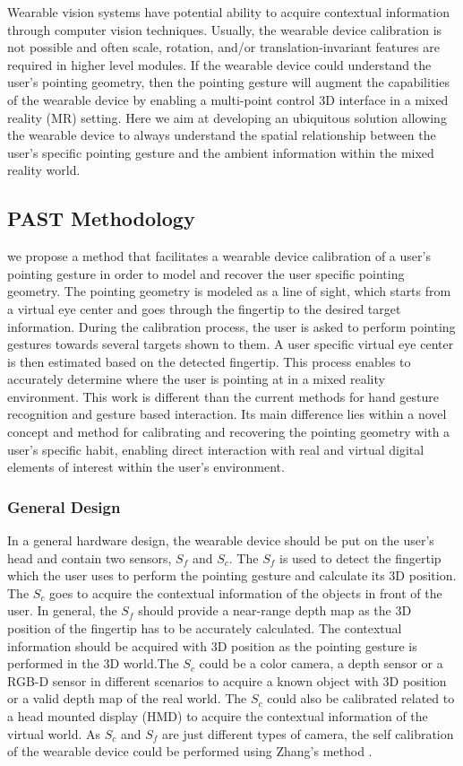 Wearable vision systems have potential ability to acquire contextual information through computer vision techniques\cite{Kurata2000}. Usually, the wearable device calibration is not possible and often scale, rotation, and/or translation-invariant features are required in higher level modules. If the wearable device could understand the user{\rq}s pointing geometry, then the pointing gesture will augment the capabilities of the wearable device by enabling a multi-point control 3D interface in a mixed reality (MR) setting. Here we aim at developing  an ubiquitous solution allowing the wearable device to always understand the spatial relationship between the user{\rq}s specific pointing gesture and the ambient information within the mixed reality world.

\subsection{PAST Methodology}
\label{sec:4-PAST:Methodology}
we propose a method that facilitates a wearable device calibration of a user's pointing gesture in order to model and recover the user specific pointing geometry. The pointing geometry is modeled as a line of sight, which starts from a virtual eye center and goes through the fingertip to the desired target information. During the calibration process, the user is asked to perform pointing gestures towards several targets shown to them. A user specific virtual eye center is then estimated based on the detected fingertip.
This process enables to accurately determine where the user is pointing at in a mixed reality environment. This work is different than the current methods for hand gesture recognition and gesture based interaction.  Its main difference lies within a novel concept and method for calibrating and recovering the pointing geometry with a user's specific habit, enabling direct interaction with real and virtual digital elements of interest within the user's environment.

\subsubsection{General Design}
\label{sec:4-PAST:GD}
In a general hardware design, the wearable device should be put on the user's head and contain two sensors, $S_{f}$ and $S_{c}$. The  $S_f$ is used to detect the fingertip which the user uses to perform the pointing gesture and calculate its 3D position. The $S_c$ goes to acquire the contextual information of the objects in front of the user. In general, the  $S_f$ should provide a near-range depth map as the 3D position of the fingertip has to be accurately calculated. The contextual information should be acquired with 3D position as the pointing gesture is performed in the 3D world.The $S_c$ could be a color camera, a depth sensor or a RGB-D sensor in different scenarios to acquire a known object with 3D position or a valid depth map of the real world. The $S_c$ could also be calibrated related to a head mounted display (HMD) to acquire the contextual information of the virtual world. As $S_c$ and  $S_f$ are just different types of camera, the self calibration of the wearable device could be performed using Zhang{\rq}s method \cite{Zhang2000}.

